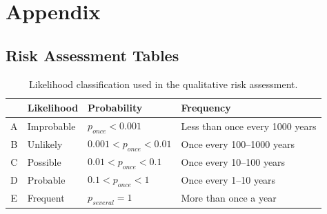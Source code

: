 \appendix

\section*{Appendix}
\label{app:appendix}

\subsection*{Risk Assessment Tables}
\label{app:risk_assessment}

\begin{table}[ht]
  \centering
  \caption{Likelihood classification used in the qualitative risk assessment.}
  \label{tab:likelihood}
  \begin{tabularx}{\textwidth}{|c|X|X|X|}
    \hline
    \textbf{} & \textbf{Likelihood} & \textbf{Probability}               & \textbf{Frequency}              \\
    \hline
    A         & Improbable          & $p_{\textit{once}} < 0.001$        & Less than once every 1000 years \\
    \hline
    B         & Unlikely            & $0.001 < p_{\textit{once}} < 0.01$ & Once every 100--1000 years      \\
    \hline
    C         & Possible            & $0.01 < p_{\textit{once}} < 0.1$   & Once every 10--100 years        \\
    \hline
    D         & Probable            & $0.1 < p_{\textit{once}} < 1$      & Once every 1--10 years          \\
    \hline
    E         & Frequent            & $p_{\textit{several}} = 1$         & More than once a year           \\
    \hline
  \end{tabularx}
\end{table}

\vspace{1em}


